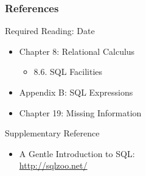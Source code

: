 \documentclass[dvipsnames]{beamer}
\theoremstyle{plain}
\begin{document}
\begin{frame}
  \frametitle{References}

  \begin{block}{Required Reading: Date}
    \begin{itemize}
      \item Chapter 8: Relational Calculus
      \begin{itemize}
        \item 8.6. \alert{SQL Facilities}
      \end{itemize}

      \item Appendix B: \alert{SQL Expressions}
      \item Chapter 19: Missing Information
    \end{itemize}
  \end{block}

  \begin{block}{Supplementary Reference}
    \begin{itemize}
      \item A Gentle Introduction to SQL:\\
        \url{http://sqlzoo.net/}
    \end{itemize}
  \end{block}
\end{frame}
\end{document}
